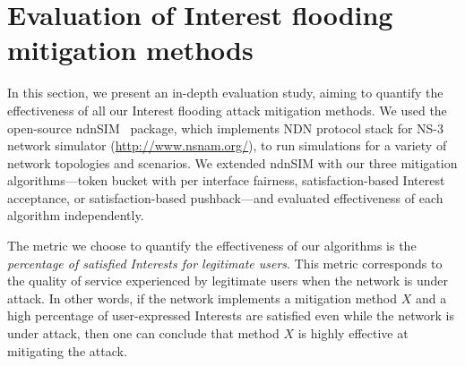 \section{Evaluation of Interest flooding mitigation methods}
\label{sec:evaluation}




In this section, we present an in-depth evaluation study, aiming to quantify the effectiveness of all our Interest flooding attack mitigation methods.
We used the open-source ndnSIM~\cite{ndnsim} package, which implements NDN protocol stack for NS-3 network simulator (\url{http://www.nsnam.org/}), to run simulations for a variety of network topologies and scenarios. 
We extended ndnSIM with our three mitigation algorithms---token bucket with per interface fairness, satisfaction-based Interest acceptance, or satisfaction-based pushback---and evaluated effectiveness of each algorithm independently.




The metric we choose to quantify the effectiveness of our algorithms is the {\it percentage of satisfied Interests for legitimate users}. This metric corresponds to the quality of service experienced by legitimate users when the network is under attack. In other words, if the network implements a mitigation method $X$ and a high percentage of user-expressed Interests are satisfied even while the network is under attack, then one can conclude that method $X$ is highly effective at mitigating the attack.%
 
